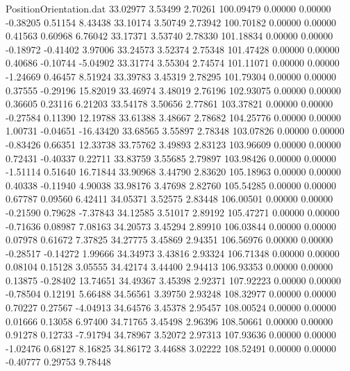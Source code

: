 \begin{filecontents}{PositionOrientation.dat}
  33.02977    3.53499    2.70261   100.09479    0.00000    0.00000   -0.38205    0.51154    8.43438
  33.10174    3.50749    2.73942   100.70182    0.00000    0.00000    0.41563    0.60968    6.76042
  33.17371    3.53740    2.78330   101.18834    0.00000    0.00000   -0.18972   -0.41402    3.97006
  33.24573    3.52374    2.75348   101.47428    0.00000    0.00000    0.40686   -0.10744   -5.04902
  33.31774    3.55304    2.74574   101.11071    0.00000    0.00000   -1.24669    0.46457    8.51924
  33.39783    3.45319    2.78295   101.79304    0.00000    0.00000    0.37555   -0.29196   15.82019
  33.46974    3.48019    2.76196   102.93075    0.00000    0.00000    0.36605    0.23116    6.21203
  33.54178    3.50656    2.77861   103.37821    0.00000    0.00000   -0.27584    0.11390   12.19788
  33.61388    3.48667    2.78682   104.25776    0.00000    0.00000    1.00731   -0.04651  -16.43420
  33.68565    3.55897    2.78348   103.07826    0.00000    0.00000   -0.83426    0.66351   12.33738
  33.75762    3.49893    2.83123   103.96609    0.00000    0.00000    0.72431   -0.40337    0.22711
  33.83759    3.55685    2.79897   103.98426    0.00000    0.00000   -1.51114    0.51640   16.71844
  33.90968    3.44790    2.83620   105.18963    0.00000    0.00000    0.40338   -0.11940    4.90038
  33.98176    3.47698    2.82760   105.54285    0.00000    0.00000    0.67787    0.09560    6.42411
  34.05371    3.52575    2.83448   106.00501    0.00000    0.00000   -0.21590    0.79628   -7.37843
  34.12585    3.51017    2.89192   105.47271    0.00000    0.00000   -0.71636    0.08987    7.08163
  34.20573    3.45294    2.89910   106.03844    0.00000    0.00000    0.07978    0.61672    7.37825
  34.27775    3.45869    2.94351   106.56976    0.00000    0.00000   -0.28517   -0.14272    1.99666
  34.34973    3.43816    2.93324   106.71348    0.00000    0.00000    0.08104    0.15128    3.05555
  34.42174    3.44400    2.94413   106.93353    0.00000    0.00000    0.13875   -0.28402   13.74651
  34.49367    3.45398    2.92371   107.92223    0.00000    0.00000   -0.78504    0.12191    5.66488
  34.56561    3.39750    2.93248   108.32977    0.00000    0.00000    0.70227    0.27567   -4.04913
  34.64576    3.45378    2.95457   108.00524    0.00000    0.00000    0.01666    0.13058    6.97400
  34.71765    3.45498    2.96396   108.50661    0.00000    0.00000    0.91278    0.12733   -7.91794
  34.78967    3.52072    2.97313   107.93636    0.00000    0.00000   -1.02476    0.68127    8.16825
  34.86172    3.44688    3.02222   108.52491    0.00000    0.00000   -0.40777    0.29753    9.78448

\end{filecontents}

